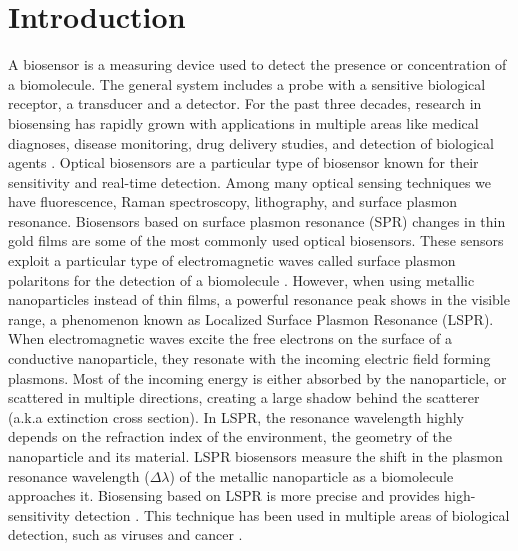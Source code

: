 \chapter{Introduction} \label{chap:intro}

A biosensor is a measuring device used to detect the presence or concentration of a biomolecule. The general system includes 
a probe with a sensitive biological receptor, a transducer and a detector. For the past three decades, research in biosensing 
has rapidly grown with applications in multiple areas like medical diagnoses, disease monitoring, drug delivery studies, 
and detection of biological agents \cite{Turner2000, Mohanty2006, Mehrotra2016}. Optical biosensors are a particular type of biosensor 
known for their sensitivity and real-time detection. Among many optical sensing techniques we have fluorescence, Raman spectroscopy, lithography, 
and surface plasmon resonance. Biosensors based on surface plasmon resonance (SPR) changes in thin gold films are some of the most 
commonly used optical biosensors.  These sensors exploit a particular type of electromagnetic waves called surface plasmon polaritons for the
detection of a biomolecule \cite{Homola2008}. However, when using metallic nanoparticles instead of thin films, a powerful resonance peak 
shows in the visible range, a phenomenon known as Localized Surface Plasmon Resonance (LSPR). When electromagnetic waves excite the free electrons on 
the surface of a conductive nanoparticle, they resonate with the incoming electric field forming plasmons. Most of the incoming energy is either 
absorbed by the nanoparticle, or scattered in multiple directions, creating a large shadow behind the scatterer (a.k.a extinction cross section). In LSPR, 
the resonance wavelength highly depends on the refraction index of the environment, the geometry of the nanoparticle and its material. LSPR biosensors measure 
the shift in the plasmon resonance wavelength ($\Delta\lambda$) of the metallic nanoparticle as a biomolecule approaches it. Biosensing based on LSPR 
is more precise and provides high-sensitivity detection \cite{Sepulveda2009}. This technique has been used in multiple areas of biological detection, 
such as viruses and cancer \cite{Wang2010, Liu2014, Zhu2016}. 

